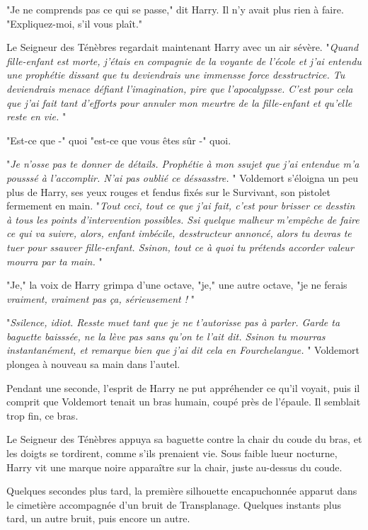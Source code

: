 "Je ne comprends pas ce qui se passe," dit Harry. Il n'y avait plus rien à faire. "Expliquez-moi, s'il vous plaît."

Le Seigneur des Ténèbres regardait maintenant Harry avec un air sévère. "\emph{Quand fille-enfant est morte, j'étais en compagnie de la voyante de l'école et j'ai entendu une prophétie dissant que tu deviendrais une immensse force desstructrice. Tu deviendrais menace défiant l'imagination, pire que l'apocalypsse. C'est pour cela que j'ai fait tant d'efforts pour annuler mon meurtre de la fille-enfant et qu'elle reste en vie.} "

"Est-ce que -" quoi "est-ce que vous êtes sûr -" quoi.

"\emph{Je n'osse pas te donner de détails. Prophétie à mon ssujet que j'ai entendue m'a pousssé à l'accomplir. N'ai pas oublié ce déssasstre.} " Voldemort s'éloigna un peu plus de Harry, ses yeux rouges et fendus fixés sur le Survivant, son pistolet fermement en main. "\emph{Tout ceci, tout ce que j'ai fait, c'est pour brisser ce desstin à tous les points d'intervention possibles. Ssi quelque malheur m'empêche de faire ce qui va suivre, alors, enfant imbécile, desstructeur annoncé, alors tu devras te tuer pour ssauver fille-enfant. Ssinon, tout ce à quoi tu prétends accorder valeur mourra par ta main.} "

"Je," la voix de Harry grimpa d'une octave, "je," une autre octave, "je ne ferais \emph{vraiment, vraiment pas ça, sérieusement !} "

"\emph{Ssilence, idiot. Resste muet tant que je ne t'autorisse pas à parler. Garde ta baguette baisssée, ne la lève pas sans qu'on te l'ait dit. Ssinon tu mourras instantanément, et remarque bien que j'ai dit cela en Fourchelangue.} " Voldemort plongea à nouveau sa main dans l'autel.

Pendant une seconde, l'esprit de Harry ne put appréhender ce qu'il voyait, puis il comprit que Voldemort tenait un bras humain, coupé près de l'épaule. Il semblait trop fin, ce bras.

Le Seigneur des Ténèbres appuya sa baguette contre la chair du coude du bras, et les doigts se tordirent, comme s'ils prenaient vie. Sous faible lueur nocturne, Harry vit une marque noire apparaître sur la chair, juste au-dessus du coude.

Quelques secondes plus tard, la première silhouette encapuchonnée apparut dans le cimetière accompagnée d'un bruit de Transplanage. Quelques instants plus tard, un autre bruit, puis encore un autre.

